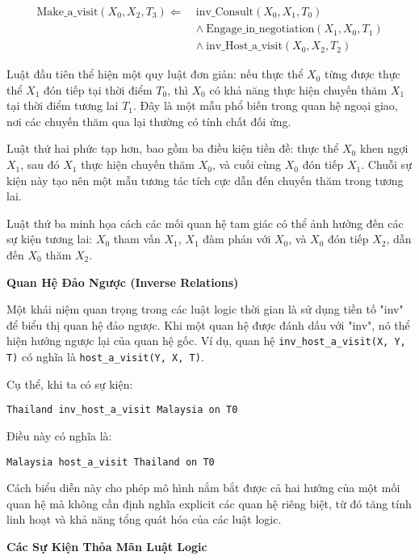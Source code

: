 \begin{equation}
\begin{aligned}
\text{Make\_a\_visit}(X_0, X_2, T_3) \Leftarrow\ &\text{inv\_Consult}(X_0, X_1, T_0) \\
&\land\ \text{Engage\_in\_negotiation}(X_1, X_0, T_1) \\
&\land\ \text{inv\_Host\_a\_visit}(X_0, X_2, T_2)
\end{aligned}
\tag{3}
\label{rule3}
\end{equation}


Luật đầu tiên thể hiện một quy luật đơn giản: nếu thực thể $X_0$ từng được thực thể $X_1$ đón tiếp tại thời điểm $T_0$, thì $X_0$ có khả năng thực hiện chuyến thăm $X_1$ tại thời điểm tương lai $T_1$. Đây là một mẫu phổ biến trong quan hệ ngoại giao, nơi các chuyến thăm qua lại thường có tính chất đối ứng.

Luật thứ hai phức tạp hơn, bao gồm ba điều kiện tiền đề: thực thể $X_0$ khen ngợi $X_1$, sau đó $X_1$ thực hiện chuyến thăm $X_0$, và cuối cùng $X_0$ đón tiếp $X_1$. Chuỗi sự kiện này tạo nên một mẫu tương tác tích cực dẫn đến chuyến thăm trong tương lai.

Luật thứ ba minh họa cách các mối quan hệ tam giác có thể ảnh hưởng đến các sự kiện tương lai: $X_0$ tham vấn $X_1$, $X_1$ đàm phán với $X_0$, và $X_0$ đón tiếp $X_2$, dẫn đến $X_0$ thăm $X_2$.

\textbf{Quan Hệ Đảo Ngược (Inverse Relations)}

Một khái niệm quan trọng trong các luật logic thời gian là sử dụng tiền tố "inv" để biểu thị quan hệ đảo ngược. Khi một quan hệ được đánh dấu với "inv", nó thể hiện hướng ngược lại của quan hệ gốc. Ví dụ, quan hệ \texttt{inv\_host\_a\_visit(X, Y, T)} có nghĩa là \texttt{host\_a\_visit(Y, X, T)}.

Cụ thể, khi ta có sự kiện:
\begin{center}
\texttt{Thailand inv\_host\_a\_visit Malaysia on T0}
\end{center}

Điều này có nghĩa là:
\begin{center}
\texttt{Malaysia host\_a\_visit Thailand on T0}
\end{center}

Cách biểu diễn này cho phép mô hình nắm bắt được cả hai hướng của một mối quan hệ mà không cần định nghĩa explicit các quan hệ riêng biệt, từ đó tăng tính linh hoạt và khả năng tổng quát hóa của các luật logic.

\textbf{Các Sự Kiện Thỏa Mãn Luật Logic}

